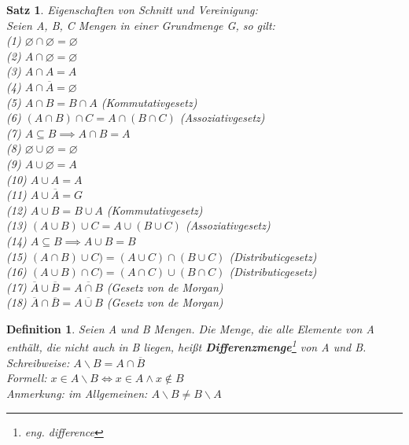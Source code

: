 \documentclass[12pt,german,a4]{article}
\begin{document}
\newtheorem{satz3}[satz]{Satz}
\begin{satz3}
Eigenschaften von Schnitt und Vereinigung:\\
Seien A, B, C Mengen in einer Grundmenge G, so gilt:\\
(1) $\varnothing \cap \varnothing = \varnothing$\\
(2) $A \cap \varnothing = \varnothing$\\
(3) $A \cap A = A$\\
(4) $A \cap \overline{A} = \varnothing$\\
(5) $A \cap B = B \cap A$ (Kommutativgesetz)\\
(6) $(A \cap B) \cap C = A \cap (B \cap C)$ (Assoziativgesetz)\\
(7) $A \subseteq B \implies A \cap B = A$\\
(8) $\varnothing \cup \varnothing = \varnothing$\\
(9) $A \cup \varnothing = A$\\
(10) $A \cup A = A$\\
(11) $A \cup \overline{A} = G$\\
(12) $A \cup B = B \cup A$ (Kommutativgesetz)\\
(13) $(A \cup B) \cup C = A \cup (B \cup C)$ (Assoziativgesetz)\\
(14) $A \subseteq B \implies A \cup B = B$\\
(15) $(A \cap B) \cup C) = (A \cup C) \cap (B \cup C)$ (Distributicgesetz)\\
(16) $(A \cup B) \cap C) = (A \cap C) \cup (B \cap C)$ (Distributicgesetz)\\
(17) $\overline{A} \cup \overline{B} = \overline{A \cap B}$ (Gesetz von de Morgan)\\
(18) $\overline{A} \cap \overline{B} = \overline{A \cup B}$ (Gesetz von de Morgan)
\end{satz3}

\newtheorem{defDifference}[defSet]{Definition}
\begin{defDifference}
Seien A und B Mengen. Die Menge, die alle Elemente von A enthält, die nicht auch in B liegen, heißt {\bf Differenzmenge}\footnote{eng. difference} von A und B.\\
Schreibweise: $A \backslash B = A \cap \overline{B}$\\
Formell: $x \in A \backslash B \Leftrightarrow x \in A \wedge x \not\in B$\\
Anmerkung: im Allgemeinen: $A \backslash B \neq B \backslash A$\\
\end{defDifference}
\end{document}
